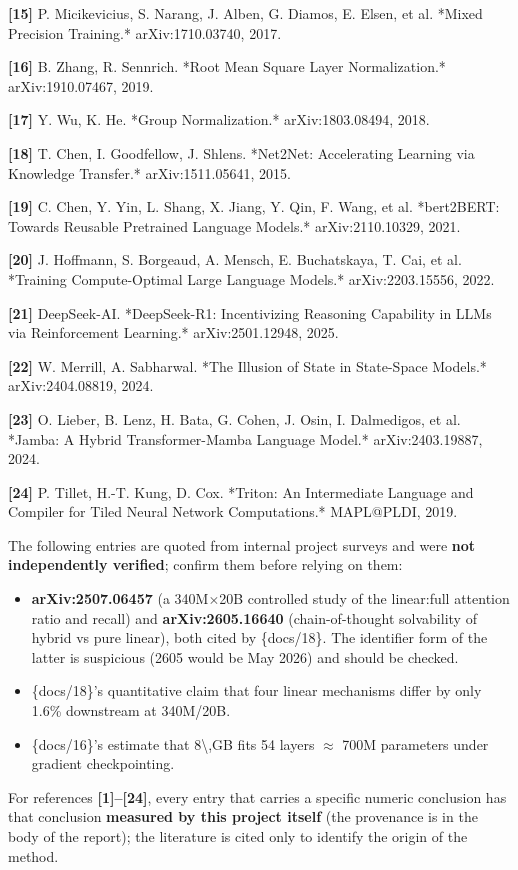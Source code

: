 \documentclass[11pt,openany]{article}
\begin{document}
\textbf{[15]} P. Micikevicius, S. Narang, J. Alben, G. Diamos, E. Elsen, et al. *Mixed Precision Training.* arXiv:1710.03740, 2017.

\textbf{[16]} B. Zhang, R. Sennrich. *Root Mean Square Layer Normalization.* arXiv:1910.07467, 2019.

\textbf{[17]} Y. Wu, K. He. *Group Normalization.* arXiv:1803.08494, 2018.

\textbf{[18]} T. Chen, I. Goodfellow, J. Shlens. *Net2Net: Accelerating Learning via Knowledge Transfer.* arXiv:1511.05641, 2015.

\textbf{[19]} C. Chen, Y. Yin, L. Shang, X. Jiang, Y. Qin, F. Wang, et al. *bert2BERT: Towards Reusable Pretrained Language Models.* arXiv:2110.10329, 2021.

\textbf{[20]} J. Hoffmann, S. Borgeaud, A. Mensch, E. Buchatskaya, T. Cai, et al. *Training Compute-Optimal Large Language Models.* arXiv:2203.15556, 2022.

\textbf{[21]} DeepSeek-AI. *DeepSeek-R1: Incentivizing Reasoning Capability in LLMs via Reinforcement Learning.* arXiv:2501.12948, 2025.

\textbf{[22]} W. Merrill, A. Sabharwal. *The Illusion of State in State-Space Models.* arXiv:2404.08819, 2024.

\textbf{[23]} O. Lieber, B. Lenz, H. Bata, G. Cohen, J. Osin, I. Dalmedigos, et al. *Jamba: A Hybrid Transformer-Mamba Language Model.* arXiv:2403.19887, 2024.

\textbf{[24]} P. Tillet, H.-T. Kung, D. Cox. *Triton: An Intermediate Language and Compiler for Tiled Neural Network Computations.* MAPL@PLDI, 2019.

\reportrule


The following entries are quoted from internal project surveys and were \textbf{not independently verified}; confirm them before relying on them:

\begin{itemize}
  \item \textbf{arXiv:2507.06457} (a 340M$\times$20B controlled study of the linear:full attention ratio and recall) and \textbf{arXiv:2605.16640} (chain-of-thought solvability of hybrid vs pure linear), both cited by \code\{docs/18\}. The identifier form of the latter is suspicious (2605 would be May 2026) and should be checked.
  \item \code\{docs/18\}'s quantitative claim that four linear mechanisms differ by only 1.6\% downstream at 340M/20B.
  \item \code\{docs/16\}'s estimate that 8\textbackslash{},GB fits 54 layers $\approx$ 700M parameters under gradient checkpointing.
\end{itemize}

For references \textbf{[1]--[24]}, every entry that carries a specific numeric conclusion has that conclusion \textbf{measured by this project itself} (the provenance is in the body of the report); the literature is cited only to identify the origin of the method.
\end{document}

